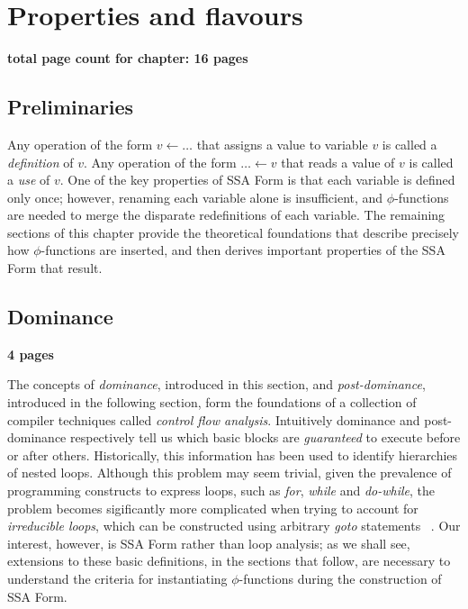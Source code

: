\chapter{Properties and flavours }

\textbf{total page count for chapter: 16 pages}

\section{Preliminaries}

Any operation of the form $v \leftarrow \ldots$ that assigns a value
to variable $v$ is called a \emph{definition} of $v$. Any operation
of the form $\ldots \leftarrow v$ that reads a value of $v$ is called
a \emph{use} of $v$. One of the key properties of SSA Form is that
each variable is defined only once; however, renaming each variable 
alone is insufficient, and $\phi$-functions are needed to merge
the disparate redefinitions of each variable. The remaining 
sections of this chapter provide the theoretical foundations that
describe precisely how $\phi$-functions are inserted, and then
derives important properties of the SSA Form that result. 

\section{Dominance}

\textbf{4 pages}

The concepts of \emph{dominance}, introduced in this section, and 
\emph{post-dominance}, introduced in the following section, form the
foundations of a collection of compiler techniques called 
\emph{control flow analysis}. Intuitively dominance and post-dominance
respectively tell us which basic blocks are \emph{guaranteed} to
execute before or after others. Historically, this information has
been used to identify hierarchies of nested loops. Although this
problem may seem trivial, given the prevalence of programming 
constructs to express loops, such as \emph{for}, \emph{while} and
\emph{do-while}, the problem becomes sigificantly more complicated
when trying to account for \emph{irreducible loops}, which can be
constructed using arbitrary \emph{goto} statements
~\cite{RamlingamSep02}. Our interest, however, is SSA Form
rather than loop analysis; as we shall see, extensions to these
basic definitions, in the sections that follow, are necessary to
understand the criteria for instantiating $\phi$-functions 
during the construction of SSA Form. 

